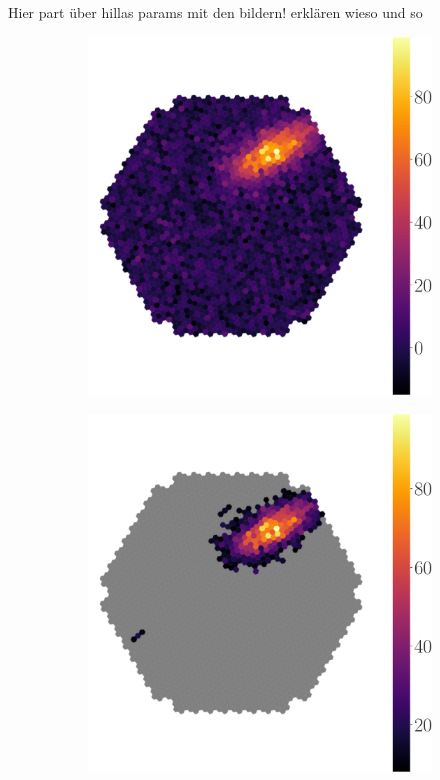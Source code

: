 Hier part über hillas params mit den bildern! erklären wieso und so
\begin{figure}
    \begin{subfigure}{0.3\textwidth}
        \includegraphics[width=0.9\linewidth]{Plots/hillas_raw.pdf} 
        \label{fig:shower_image_raw}
    \end{subfigure}
    \begin{subfigure}{0.3\textwidth}
        \includegraphics[width=0.9\linewidth]{Plots/hillas_cleaned.pdf}

\end{subfigure}
\end{figure}
